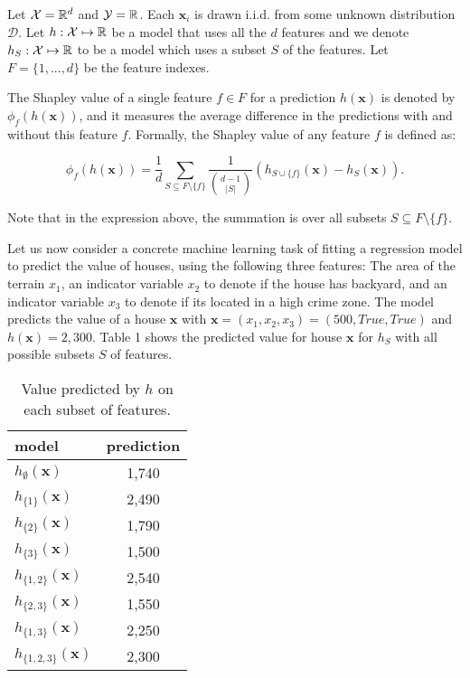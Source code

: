 Let ${\cal X} = \mathbb{R}^{d}$ and ${\cal Y} = \mathbb{R}$. Each $\mathbf{x}_i$ is drawn i.i.d. from some unknown distribution $\mathcal{D}$. Let $h:\mathcal{\cal X}\mapsto \mathbb{R}$ be a model that uses all the $d$ features and we denote $h_S:\mathcal{\cal X}\mapsto \mathbb{R}$ to be a model which uses a subset $S$ of the features. Let $F=\{1,...,d\}$ be the feature indexes.

The Shapley value of a single feature $f \in F$ for a prediction $h(\mathbf{x})$ is denoted by $\phi_{f}(h(\mathbf{x}))$, and it measures the average difference in the predictions with and without this feature $f$.  Formally, the Shapley value of any feature $f$ is defined as:

\[\phi_{f}(h(\mathbf{x})) = \frac{1}{d} \sum_{S \subseteq F \setminus \{f\}} \frac{1}{ \binom{d-1}{|S|} }
\left(h_{S \cup \{f\}}(\mathbf{x}) - h_{S}(\mathbf{x}) \right). \] 

Note that in the expression above, the summation is over all subsets $S\subseteq F \setminus \{f\}$. 

Let us now consider a concrete machine learning task of fitting a regression model to predict the value of houses, using the following three features: 
The area of the terrain $x_{1}$, an indicator variable $x_{2}$ to denote if the house has backyard, and an indicator variable $x_{3}$ to denote if its located in a high crime zone.  The model predicts the value of a house $\mathbf{x}$ with $\mathbf{x}=(x_{1},x_{2},x_{3})=(500,True,True)$ and $h(\mathbf{x})=2,300$. Table 1 shows the predicted value for house $\mathbf{x}$ for $h_{S}$ with all possible subsets $S$ of features. 

\begin{table}[htb!]
  \label{sample-table}
  \centering
  \begin{tabular}{lc}
    model & prediction\\
    \toprule
    $h_{\emptyset}(\mathbf{x})$ & 1,740 \\
    $h_{\{1\}}(\mathbf{x})$   & 2,490 \\
    $h_{\{2\}}(\mathbf{x})$   & 1,790 \\ 
    $h_{\{3\}}(\mathbf{x})$ & 1,500	\\
    $h_{\{1,2\}}(\mathbf{x})$ & 2,540	\\ 
    $h_{\{2,3\}}(\mathbf{x})$ & 1,550	\\ 
    $h_{\{1,3\}}(\mathbf{x})$ & 2,250	\\ 
    $h_{\{1,2,3\}}(\mathbf{x})$ & 2,300	\\ 
    \bottomrule
  \end{tabular}
 \caption{Value predicted by $h$ on each subset of features.}
  \label{tab:logreg}
\end{table}

